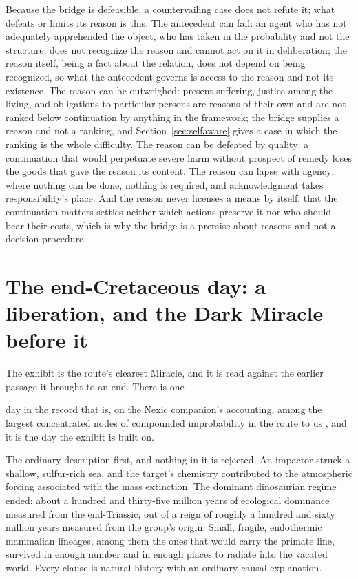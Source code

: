 Because the bridge is defeasible, a countervailing case does not refute it;
what defeats or limits its reason is this. The antecedent can fail: an agent who has not adequately apprehended the object,
who has taken in the probability and not the structure, does not recognize
the reason and cannot act on it in deliberation; the reason itself, being a
fact about the relation, does not depend on being recognized, so what the
antecedent governs is access to the reason and not its existence. The reason
can be outweighed: present suffering, justice among the living, and
obligations to particular persons are reasons of their own and are not ranked
below continuation by anything in the framework; the bridge supplies a reason
and not a ranking, and Section~\ref{sec:selfaware} gives a case in which the
ranking is the whole difficulty. The reason can be defeated by quality: a
continuation that would perpetuate severe harm without prospect of remedy
loses the goods that gave the reason its content. The reason can lapse with
agency: where nothing can be done, nothing is required, and acknowledgment
takes responsibility's place. And the reason never licenses a means by itself:
that the continuation matters settles neither which actions preserve it nor
who should bear their costs, which is why the bridge is a premise about reasons
and not a decision procedure.

\section{The end-Cretaceous day: a liberation, and the Dark Miracle before it}\label{sec:kpg}

The exhibit is the route's clearest Miracle, and it is read against the
earlier passage it brought to an end. There is one

day in the record that is, on the Nexic companion's
accounting, among the largest concentrated nodes of compounded improbability
in the route to us \cite{Nexus}, and it is the day the exhibit is built on.

The ordinary description first, and nothing in it is rejected. An impactor
struck a shallow, sulfur-rich sea, and the target's chemistry contributed to
the atmospheric forcing associated with the mass extinction. The dominant
dinosaurian regime ended: about a hundred and thirty-five million years of
ecological dominance measured from the end-Triassic, out of a reign of roughly
a hundred and sixty million years measured from the group's origin. Small,
fragile, endothermic mammalian lineages, among them the ones that would carry
the primate line, survived in enough number and in enough places to radiate
into the vacated world. Every clause is natural history with an ordinary
causal explanation.

